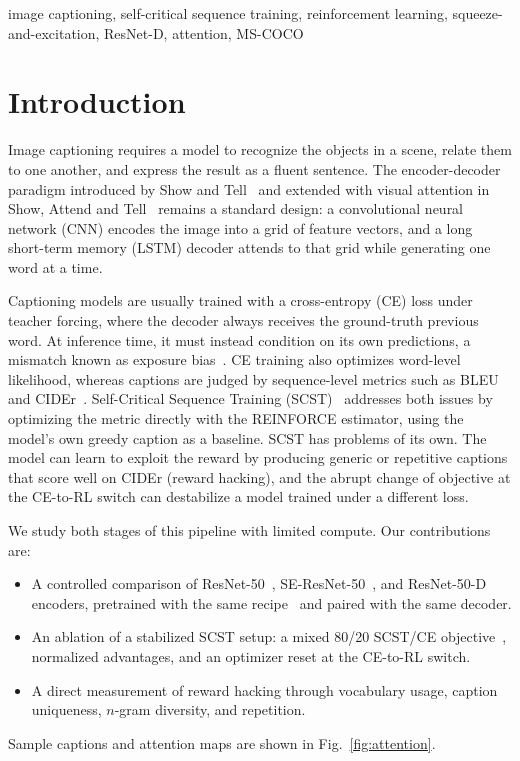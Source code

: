 \documentclass[conference]{IEEEtran}
\begin{document}
\begin{IEEEkeywords}
image captioning, self-critical sequence training, reinforcement learning,
squeeze-and-excitation, ResNet-D, attention, MS-COCO
\end{IEEEkeywords}

\section{Introduction}
Image captioning requires a model to recognize the objects in a scene, relate
them to one another, and express the result as a fluent sentence. The
encoder-decoder paradigm introduced by Show and Tell~\cite{vinyals2015show}
and extended with visual attention in Show, Attend and
Tell~\cite{xu2015show} remains a standard design: a convolutional neural
network (CNN) encodes the image into a grid of feature vectors, and a
long short-term memory (LSTM) decoder attends to that grid while generating one
word at a time.

Captioning models are usually trained with a cross-entropy (CE) loss under
teacher forcing, where the decoder always receives the ground-truth previous
word. At inference time, it must instead condition on its own predictions, a
mismatch known as exposure bias~\cite{ranzato2016sequence,bengio2015scheduled}.
CE training also optimizes word-level likelihood, whereas captions are judged
by sequence-level metrics such as BLEU~\cite{papineni2002bleu} and
CIDEr~\cite{vedantam2015cider}. Self-Critical Sequence Training
(SCST)~\cite{rennie2017self} addresses both issues by optimizing the metric
directly with the REINFORCE estimator, using the model's own greedy caption as
a baseline. SCST has problems of its own. The model can learn to exploit the
reward by producing generic or repetitive captions that score well on CIDEr
(reward hacking), and the abrupt change of objective at the CE-to-RL switch can
destabilize a model trained under a different loss.

We study both stages of this pipeline with limited compute. Our contributions
are:
\begin{itemize}
\item A controlled comparison of ResNet-50~\cite{he2016deep},
SE-ResNet-50~\cite{hu2018squeeze}, and ResNet-50-D~\cite{he2019bag} encoders,
pretrained with the same recipe~\cite{wightman2021resnet} and paired with the
same decoder.
\item An ablation of a stabilized SCST setup: a mixed 80/20 SCST/CE
objective~\cite{paulus2018deep}, normalized advantages, and an optimizer reset
at the CE-to-RL switch.
\item A direct measurement of reward hacking through vocabulary usage, caption
uniqueness, $n$-gram diversity, and repetition.
\end{itemize}
Sample captions and attention maps are shown in Fig.~\ref{fig:attention}.
\end{document}
